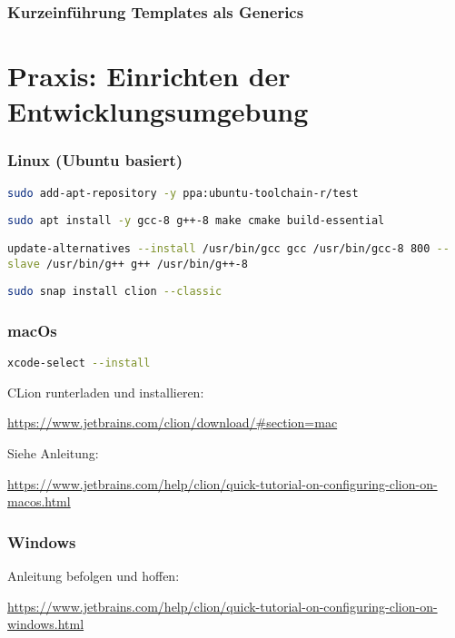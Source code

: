 \documentclass[aspectratio=169]{beamer}
\begin{document}
\begin{frame}
    \frametitle{Kurzeinführung Templates als Generics}
    
\end{frame}

\section{Praxis: Einrichten der Entwicklungsumgebung}

\begin{frame}
    \frametitle{Linux (Ubuntu basiert)}
    \lstinline[language=bash]{sudo add-apt-repository -y ppa:ubuntu-toolchain-r/test}

    \lstinline[language=bash]{sudo apt install -y gcc-8 g++-8 make cmake build-essential}

    \lstinline[language=bash]{update-alternatives --install /usr/bin/gcc gcc /usr/bin/gcc-8 800 --slave /usr/bin/g++ g++ /usr/bin/g++-8}

    \vspace{1cm}

    \lstinline[language=bash]{sudo snap install clion --classic}
\end{frame}

\begin{frame}
    \frametitle{macOs}
    \lstinline[language=bash]{xcode-select --install}

    \vspace{1cm}

    CLion runterladen und installieren: 
    
    \url{https://www.jetbrains.com/clion/download/\#section=mac}

    \vspace{1cm}

    Siehe Anleitung: 
    
    \url{https://www.jetbrains.com/help/clion/quick-tutorial-on-configuring-clion-on-macos.html}
\end{frame}

\begin{frame}
    \frametitle{Windows}

    Anleitung befolgen und hoffen: 
    
    \url{https://www.jetbrains.com/help/clion/quick-tutorial-on-configuring-clion-on-windows.html}
\end{frame}
\end{document}
